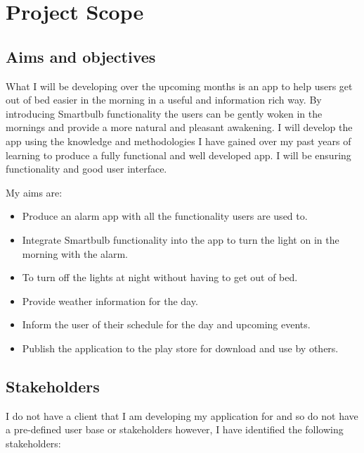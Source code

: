 \section{Project Scope}\label{project-scope}

\subsection{Aims and objectives}\label{aims-and-objectives}

What I will be developing over the upcoming months is an app to help
users get out of bed easier in the morning in a useful and information
rich way. By introducing Smartbulb functionality the users can be gently
woken in the mornings and provide a more natural and pleasant awakening.
I will develop the app using the knowledge and methodologies I have
gained over my past years of learning to produce a fully functional and
well developed app. I will be ensuring functionality and good user
interface.

My aims are:

\begin{itemize}
\tightlist
\item
  Produce an alarm app with all the functionality users are used to.
\item
  Integrate Smartbulb functionality into the app to turn the light on in
  the morning with the alarm.
\item
  To turn off the lights at night without having to get out of bed.
\item
  Provide weather information for the day.
\item
  Inform the user of their schedule for the day and upcoming events.
\item
  Publish the application to the play store for download and use by
  others.
\end{itemize}

\subsection{Stakeholders}\label{stakeholders}

I do not have a client that I am developing my application for and so do
not have a pre-defined user base or stakeholders however, I have
identified the following stakeholders:

